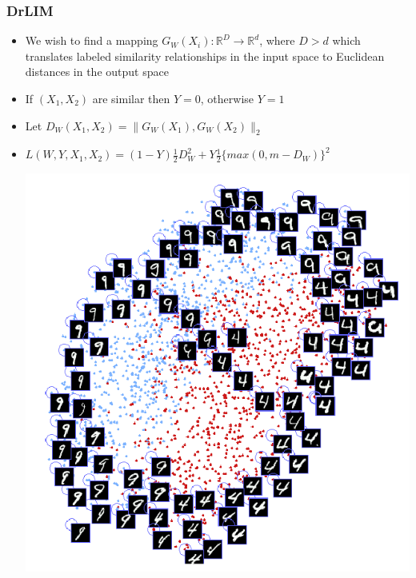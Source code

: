 \documentclass{beamer}
\begin{document}
\begin{frame}
\frametitle{DrLIM} 
\begin{itemize}
\item{We wish to find a mapping $G_W(X_i): \mathbb{R}^D \rightarrow \mathbb{R}^d$, where $D>d$ which translates labeled similarity relationships in the input space to Euclidean distances in the output space} 
\item{If $(X_1, X_2)$ are similar then $Y=0$, otherwise $Y=1$}
\item{Let $D_W(X_1, X_2) = \|G_W(X_1),G_W(X_2)\|_2$}
\item{$L(W,Y,X_1,X_2) = (1-Y)\frac{1}{2}D_W^2 + Y \frac{1}{2}\{max(0,m-D_W)\}^2$}   
\begin{center}
\includegraphics[scale = 0.20]{drlim.png} 
\end{center} 
\end{itemize} 
\end{frame} 
\end{document}
